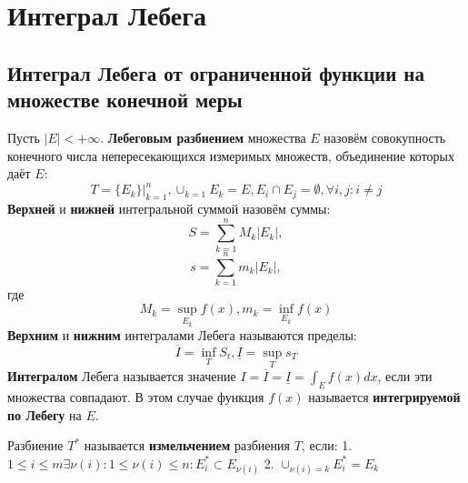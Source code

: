 \documentclass[11pt]{article}
\begin{document}
\section{Интеграл Лебега}
\label{sec:orgeb1302c}
\subsection{Интеграл Лебега от ограниченной функции на множестве конечной меры}
\label{sec:org1937225}
Пусть \(|E| < +\infty\). \textbf{Лебеговым разбиением} множества \(E\) назовём совокупность конечного
числа непересекающихся измеримых множеств, объединение которых даёт \(E\):
\begin{equation}
T = \{E_k\}|_{k = 1}^n, \cup_{k = 1}E_k = E, E_i \cap E_j = \emptyset, \forall i, j: i \neq j
\end{equation}
\textbf{Верхней} и \textbf{нижней} интегральной суммой назовём суммы:
\begin{equation}
S = \sum_{k = 1}^nM_k|E_k|,
\end{equation}
\begin{equation}
s = \sum_{k = 1}^nm_k|E_k|,
\end{equation}
где
\begin{equation}
M_k = \sup_{E_k}f(x), m_k = \inf_{E_k}f(x)
\end{equation}
\textbf{Верхним} и \textbf{нижним} интегралами Лебега называются пределы:
\begin{equation}
\overline{I} = \inf_TS_t, \underline{I} = \sup_{T}s_T
\end{equation}
\textbf{Интегралом} Лебега называется значение \(I = \overline{I} = \underline{I} = \int_Ef(x)dx\),
если эти множества совпадают. В этом случае функция \(f(x)\) называется \textbf{интегрируемой по Лебегу}
на \(E\).

Разбиение \(T^*\) называется \textbf{измельчением} разбиения \(T\), если:
1. $1 \leq i \leq m \exists \nu(i): 1 \leq \nu(i) \leq n: E_i^* \subset E_{\nu(i)}$
2. $\cup_{\nu(i) = k}E^*_i = E_k$
\end{document}
